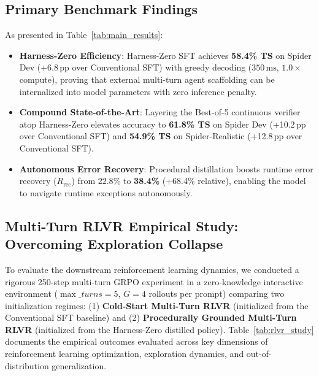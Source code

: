 \documentclass{article}
\theoremstyle{plain}
\theoremstyle{definition}
\theoremstyle{remark}
\begin{document}
\subsection{Primary Benchmark Findings}
As presented in Table~\ref{tab:main_results}:
\begin{itemize}[leftmargin=*,itemsep=2pt]
    \item \textbf{Harness-Zero Efficiency}: Harness-Zero SFT achieves \textbf{58.4\% TS} on Spider Dev (+6.8\,pp over Conventional SFT) with greedy decoding ($350\,\text{ms}$, $1.0\times$ compute), proving that external multi-turn agent scaffolding can be internalized into model parameters with zero inference penalty.
    \item \textbf{Compound State-of-the-Art}: Layering the Best-of-5 continuous verifier atop Harness-Zero elevates accuracy to \textbf{61.8\% TS} on Spider Dev (+10.2\,pp over Conventional SFT) and \textbf{54.9\% TS} on Spider-Realistic (+12.8\,pp over Conventional SFT).
    \item \textbf{Autonomous Error Recovery}: Procedural distillation boosts runtime error recovery ($R_{\text{rec}}$) from $22.8\%$ to \textbf{38.4\%} (+68.4\% relative), enabling the model to navigate runtime exceptions autonomously.
\end{itemize}

\subsection{Multi-Turn RLVR Empirical Study: Overcoming Exploration Collapse}
To evaluate the downstream reinforcement learning dynamics, we conducted a rigorous 250-step multi-turn GRPO experiment in a zero-knowledge interactive environment ($\max\_turns = 5$, $G=4$ rollouts per prompt) comparing two initialization regimes: (1) \textbf{Cold-Start Multi-Turn RLVR} (initialized from the Conventional SFT baseline) and (2) \textbf{Procedurally Grounded Multi-Turn RLVR} (initialized from the Harness-Zero distilled policy). Table~\ref{tab:rlvr_study} documents the empirical outcomes evaluated across key dimensions of reinforcement learning optimization, exploration dynamics, and out-of-distribution generalization.
\end{document}
